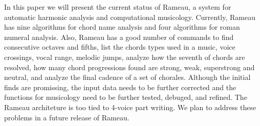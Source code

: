 In this paper we will present the current status of Rameau, a system
for automatic harmonic analysis and computational musicology.
Currently, Rameau has nine algorithms for chord name analysis and four
algorithms for roman numeral analysis. Also, Rameau has a good number
of commands to find consecutive octaves and fifths, list the chords
types used in a music, voice crossings, vocal range, melodic jumps,
analyze how the seventh of chords are resolved, how many chord
progressions found are strong, weak, superstrong and neutral, and
analyze the final cadence of a set of chorales. Although the initial
finds are promissing, the input data needs to be further corrected and
the functions for musicology need to be further tested, debuged, and
refined. The Rameau architeture is too tied to 4-voice part writing.
We plan to address these problems in a future release of Rameau.
